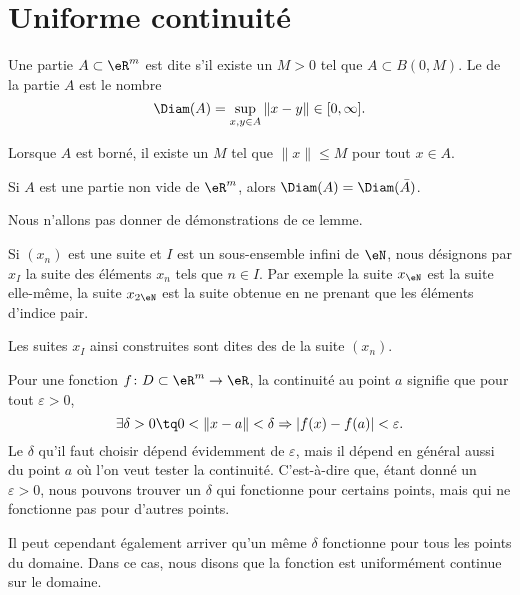 \section{Uniforme continuité}		\label{SecUnifContinue}

\begin{definition}
	Une partie $A\subset\eR^m$ est dite  s'il existe un $M>0$ tel que $A\subset B(0,M)$. Le  de la partie $A$ est le nombre
	\begin{equation}
		\Diam(A)=\sup_{x,y\in A}\| x-y \|\in\mathopen[ 0 , \infty \mathclose].
	\end{equation}
\end{definition}
Lorsque $A$ est borné, il existe un $M$ tel que $\| x \|\leq M$ pour tout $x\in A$.

\begin{lemma}
	Si $A$ est une partie non vide de $\eR^m$, alors $\Diam(A)=\Diam(\bar A)$.
\end{lemma}
Nous n'allons pas donner de démonstrations de ce lemme.


Si $(x_n)$ est une suite et $I$ est un sous-ensemble infini de $\eN$, nous désignons par $x_I$ la suite des éléments $x_n$ tels que $n\in I$. Par exemple la suite $x_{\eN}$ est la suite elle-même, la suite $x_{2\eN}$ est la suite obtenue en ne prenant que les éléments d'indice pair.

Les suites $x_I$ ainsi construites sont dites des  de la suite $(x_n)$.


Pour une fonction $f\colon D\subset\eR^m\to \eR$, la continuité au point $a$ signifie que pour tout $\varepsilon>0$,
\begin{equation}
	\exists\delta>0\tq 0<\| x-a \|<\delta\Rightarrow | f(x)-f(a) |<\varepsilon.
\end{equation}
Le $\delta$ qu'il faut choisir dépend évidemment de $\varepsilon$, mais il dépend en général aussi du point $a$ où l'on veut tester la continuité. C'est-à-dire que, étant donné un $\varepsilon>0$, nous pouvons trouver un $\delta$ qui fonctionne pour certains points, mais qui ne fonctionne pas pour d'autres points.

Il peut cependant également arriver qu'un même $\delta$ fonctionne pour tous les points du domaine. Dans ce cas, nous disons que la fonction est uniformément continue sur le domaine.

